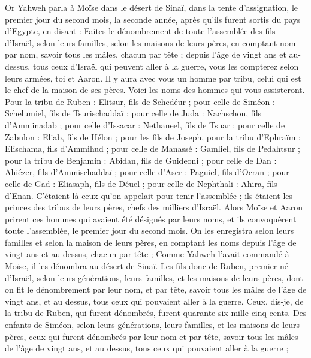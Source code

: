\begin{multicols}{2}
\VerseOne{}Or Yahweh parla à Moïse dans le désert de Sinaï, dans la tente d'assignation, le premier jour du second mois, la seconde année, après qu'ils furent sortis du pays d'Egypte, en disant :
Faites le dénombrement de toute l'assemblée des fils d'Israël, selon leurs familles, selon les maisons de leurs pères, en comptant nom par nom, savoir tous les mâles, chacun par tête ;
depuis l'âge de vingt ans et au-dessus, tous ceux d'Israël qui peuvent aller à la guerre, vous les compterez selon leurs armées, toi et Aaron.
Il y aura avec vous un homme par tribu, celui qui est le chef de la maison de ses pères.
Voici les noms des hommes qui vous assisteront. Pour la tribu de Ruben : Elitsur, fils de Schedéur ;
pour celle de Siméon : Schelumiel, fils de Tsurischaddaï ;
pour celle de Juda : Nachschon, fils d'Amminadab ;
pour celle d'Issacar : Nethaneel, fils de Tsuar ;
pour celle de Zabulon : Eliab, fils de Hélon ;
pour les fils de Joseph, pour la tribu d'Ephraïm : Elischama, fils d'Ammihud ; pour celle de Manassé : Gamliel, fils de Pedahtsur ;
pour la tribu de Benjamin : Abidan, fils de Guideoni ;
pour celle de Dan : Ahiézer, fils d'Ammischaddaï ;
pour celle d'Aser : Paguiel, fils d'Ocran ;
pour celle de Gad : Eliasaph, fils de Déuel ;
pour celle de Nephthali : Ahira, fils d'Enan.
C'étaient là ceux qu'on appelait pour tenir l'assemblée ; ils étaient les princes des tribus de leurs pères, chefs des milliers d'Israël.
Alors Moïse et Aaron prirent ces hommes qui avaient été désignés par leurs noms,
et ils convoquèrent toute l'assemblée, le premier jour du second mois. On les enregistra selon leurs familles et selon la maison de leurs pères, en comptant les noms depuis l'âge de vingt ans et au-dessus, chacun par tête ;
Comme Yahweh l'avait commandé à Moïse, il les dénombra au désert de Sinaï.
Les fils donc de Ruben, premier-né d'Israël, selon leurs générations, leurs familles, et les maisons de leurs pères, dont on fit le dénombrement par leur nom, et par tête, savoir tous les mâles de l'âge de vingt ans, et au dessus, tous ceux qui pouvaient aller à la guerre.
Ceux, dis-je, de la tribu de Ruben, qui furent dénombrés, furent quarante-six mille cinq cents.
Des enfants de Siméon, selon leurs générations, leurs familles, et les maisons de leurs pères, ceux qui furent dénombrés par leur nom et par tête, savoir tous les mâles de l'âge de vingt ans, et au dessus, tous ceux qui pouvaient aller à la guerre ;

\end{multicols}
